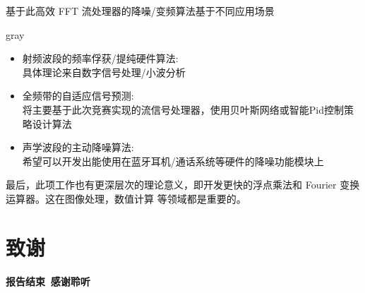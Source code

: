 \documentclass[8pt]{ctexbeamer}
\renewenvironment{quote}
{
	\begin{notebox}{gray}
}
{
	\end{notebox}
}
\begin{document}
\begin{frame}{基于此高效 FFT 流处理器的降噪/变频算法}{基于不同应用场景}
	\begin{quote}
		\begin{itemize}
			\item 射频波段的频率俘获/提纯硬件算法:\\
				{\fontsize{5pt}{2pt}\selectfont 具体理论来自数字信号处理/小波分析}
			\item 全频带的自适应信号预测:\\
				{\fontsize{5pt}{2pt}\selectfont 
				将主要基于此次竞赛实现的流信号处理器，使用贝叶斯网络或智能Pid控制策略设计算法}
			\item 声学波段的主动降噪算法:\\
				{\fontsize{5pt}{2pt}\selectfont 
				希望可以开发出能使用在蓝牙耳机/通话系统等硬件的降噪功能模块上}
		\end{itemize}
	\end{quote}

	最后，此项工作也有更深层次的理论意义，即开发更快的浮点乘法和 Fourier 变换运算器。这在图像处理，数值计算
	等领域都是重要的。
\end{frame}

\section{致谢}

\begin{frame}
	\begin{center}
		\Huge\textbf{报告结束\, 感谢聆听}
	\end{center}
\end{frame}
\end{document}

